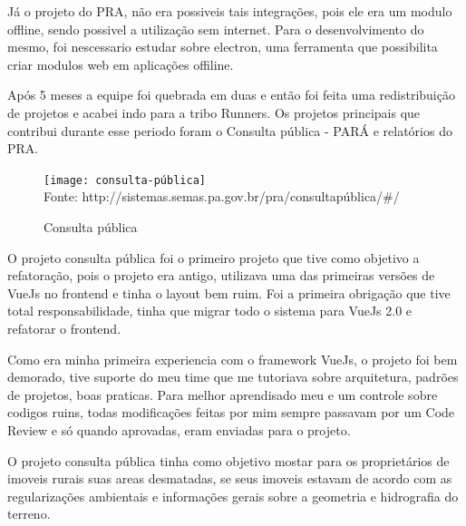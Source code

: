 Já o projeto do PRA, não era possiveis tais integrações, pois ele era um modulo offline, sendo possivel a utilização sem internet. Para o desenvolvimento do mesmo, foi nescessario estudar sobre electron, uma ferramenta que possibilita criar modulos web em aplicações offiline.

Após 5 meses a equipe foi quebrada em duas e então foi feita uma redistribuição de projetos e acabei indo para a tribo Runners. Os projetos principais que contribui durante esse periodo foram o Consulta pública - PARÁ e relatórios do PRA.

\begin{figure}[H]
\centering
\caption{Consulta pública} %
\texttt{[image: consulta-pública]}\\  %
{\small Fonte: http://sistemas.semas.pa.gov.br/pra/consultapública/#/} %
\label{fig:exemplo} %
\end{figure}

O projeto consulta pública foi o primeiro projeto que tive como objetivo a refatoração, pois o projeto era antigo, utilizava uma das primeiras versões de VueJs no frontend e tinha o layout bem ruim.
Foi a primeira obrigação que tive total responsabilidade, tinha que migrar todo o sistema para VueJs 2.0 e refatorar o frontend.

Como era minha primeira experiencia com o framework VueJs, o projeto foi bem demorado, tive suporte do meu time que me tutoriava sobre arquitetura, padrões de projetos, boas praticas.
Para melhor aprendisado meu e um controle sobre codigos ruins, todas modificações feitas por mim sempre passavam por um Code Review e só quando aprovadas, eram enviadas para o projeto. 

O projeto consulta pública tinha como objetivo mostar para os proprietários de imoveis rurais suas areas desmatadas, se seus imoveis estavam de acordo com as regularizações ambientais e informações gerais sobre a geometria e hidrografia do terreno.


